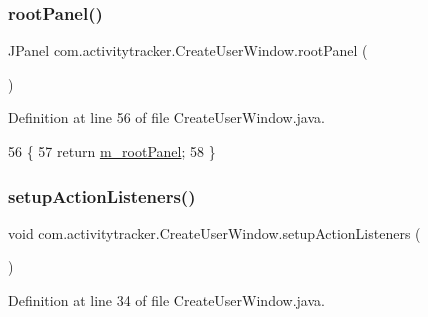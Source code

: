 \subsubsection{\texorpdfstring{root\+Panel()}{rootPanel()}}
{\footnotesize\ttfamily J\+Panel com.\+activitytracker.\+Create\+User\+Window.\+root\+Panel (\begin{DoxyParamCaption}{ }\end{DoxyParamCaption})\hspace{0.3cm}{\ttfamily [package]}}



Definition at line 56 of file Create\+User\+Window.\+java.


\begin{DoxyCode}
56                        \{
57         \textcolor{keywordflow}{return} \mbox{\hyperlink{classcom_1_1activitytracker_1_1_create_user_window_a5a678326afe519b6a2c9e7a2d9eff87c}{m\_rootPanel}};
58     \}
\end{DoxyCode}
\mbox{\label{classcom_1_1activitytracker_1_1_create_user_window_a174a05a389ca6f3b7979ac9c5028a3ae}} 
\subsubsection{\texorpdfstring{setup\+Action\+Listeners()}{setupActionListeners()}}
{\footnotesize\ttfamily void com.\+activitytracker.\+Create\+User\+Window.\+setup\+Action\+Listeners (\begin{DoxyParamCaption}{ }\end{DoxyParamCaption})\hspace{0.3cm}{\ttfamily [private]}}



Definition at line 34 of file Create\+User\+Window.\+java.


